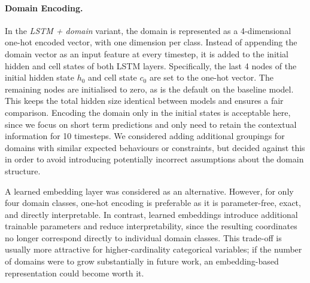 


        \paragraph{Domain Encoding.}
        In the \textit{\ac{LSTM} + domain} variant, the domain is represented as a 4-dimensional one-hot encoded vector, with one dimension per class. Instead of appending the domain vector as an input feature at every timestep, it is added to the initial hidden and cell states of both LSTM layers.
        Specifically, the last 4 nodes of the initial hidden state $h_0$ and cell state $c_0$ are set to the one-hot vector. The remaining nodes are initialised to zero, as is the default on the baseline model. This keeps the total hidden size identical between models and ensures a fair comparison.  %
        Encoding the domain only in the initial states is acceptable here, since we focus on short term predictions and only need to retain the contextual information for 10 timesteps. %
        We considered adding additional groupings for domains with similar expected behaviours or constraints, but decided against this in order to avoid introducing potentially incorrect assumptions about the domain structure.
       
        A learned embedding layer was considered as an alternative. However, for only four domain classes, one-hot encoding is preferable as it is parameter-free, exact, and directly interpretable.
        In contrast, learned embeddings introduce additional trainable parameters and reduce interpretability, since the resulting coordinates no longer correspond directly to individual domain classes.
        This trade-off is usually more attractive for higher-cardinality categorical variables; if the number of domains were to grow substantially in future work, an embedding-based representation could become worth it.

